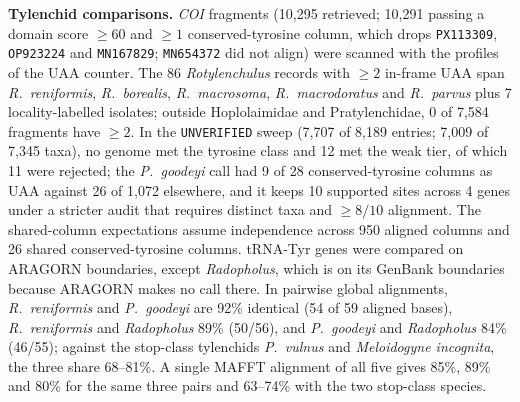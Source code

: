 \documentclass[11pt, a4paper]{article}
\begin{document}
\textbf{Tylenchid comparisons.} \textit{COI} fragments (10,295 retrieved; 10,291 passing a domain score $\ge 60$ and $\ge 1$ conserved-tyrosine column, which drops \texttt{PX113309}, \texttt{OP923224} and \texttt{MN167829}; \texttt{MN654372} did not align) were scanned with the profiles of the UAA counter. The 86 \textit{Rotylenchulus} records with $\ge 2$ in-frame UAA span \textit{R.\ reniformis}, \textit{R.\ borealis}, \textit{R.\ macrosoma}, \textit{R.\ macrodoratus} and \textit{R.\ parvus} plus 7 locality-labelled isolates; outside Hoplolaimidae and Pratylenchidae, 0 of 7,584 fragments have $\ge 2$. In the \texttt{UNVERIFIED} sweep (7,707 of 8,189 entries; 7,009 of 7,345 taxa), no genome met the tyrosine class and 12 met the weak tier, of which 11 were rejected; the \textit{P.\ goodeyi} call had 9 of 28 conserved-tyrosine columns as UAA against 26 of 1,072 elsewhere, and it keeps 10 supported sites across 4 genes under a stricter audit that requires distinct taxa and $\ge 8/10$ alignment. The shared-column expectations assume independence across 950 aligned columns and 26 shared conserved-tyrosine columns. tRNA-Tyr genes were compared on ARAGORN boundaries, except \textit{Radopholus}, which is on its GenBank boundaries because ARAGORN makes no call there. In pairwise global alignments, \textit{R.\ reniformis} and \textit{P.\ goodeyi} are 92\% identical (54 of 59 aligned bases), \textit{R.\ reniformis} and \textit{Radopholus} 89\% (50/56), and \textit{P.\ goodeyi} and \textit{Radopholus} 84\% (46/55); against the stop-class tylenchids \textit{P.\ vulnus} and \textit{Meloidogyne incognita}, the three share 68--81\%. A single MAFFT alignment of all five gives 85\%, 89\% and 80\% for the same three pairs and 63--74\% with the two stop-class species.
\end{document}
